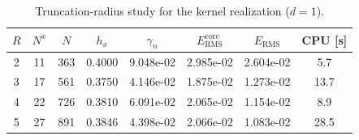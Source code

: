 \begin{table}[tb]
  \centering
  \small
  \caption{Truncation-radius study for the kernel realization ($d=1$).}
  \label{tab:ker.domain_d1}
  \begin{tabular}{cccccccc}
    \toprule
    $R$ & $N^x$ & $N$ & $h_x$ & $\gamma_n$ & $E_{\mathrm{RMS}}^{\mathrm{core}}$ & $E_{\mathrm{RMS}}$ & CPU [s] \\
    \midrule
    2 & 11 & 363 & 0.4000 & 9.048e-02 & 2.985e-02 & 2.604e-02 & 5.7 \\
    3 & 17 & 561 & 0.3750 & 4.146e-02 & 1.875e-02 & 1.273e-02 & 13.7 \\
    4 & 22 & 726 & 0.3810 & 6.091e-02 & 2.065e-02 & 1.154e-02 & 8.9 \\
    5 & 27 & 891 & 0.3846 & 4.398e-02 & 2.066e-02 & 1.083e-02 & 28.5 \\
    \bottomrule
  \end{tabular}
\end{table}
